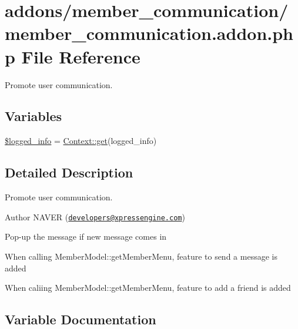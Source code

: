 \hypertarget{member__communication_8addon_8php}{}\section{addons/member\+\_\+communication/member\+\_\+communication.addon.\+php File Reference}
\label{member__communication_8addon_8php}


Promote user communication.  


\subsection*{Variables}
\begin{DoxyCompactItemize}
\item 
\hyperlink{member__communication_8addon_8php_a193c1593ceb216e9fb05b0bad01ebbc8}{\$logged\+\_\+info} = \hyperlink{classContext_a90ce25d65fe6c9778421cbb36ab3def5}{Context\+::get}(\textquotesingle{}logged\+\_\+info\textquotesingle{})
\end{DoxyCompactItemize}


\subsection{Detailed Description}
Promote user communication. 

\begin{DoxyAuthor}{Author}
N\+A\+V\+ER (\href{mailto:developers@xpressengine.com}{\tt developers@xpressengine.\+com})
\begin{DoxyItemize}
\item Pop-\/up the message if new message comes in
\item When calling Member\+Model\+::get\+Member\+Menu, feature to send a message is added
\item When caliing Member\+Model\+::get\+Member\+Menu, feature to add a friend is added 
\end{DoxyItemize}
\end{DoxyAuthor}


\subsection{Variable Documentation}
\hypertarget{member__communication_8addon_8php_a193c1593ceb216e9fb05b0bad01ebbc8}{}\label{member__communication_8addon_8php_a193c1593ceb216e9fb05b0bad01ebbc8} 

